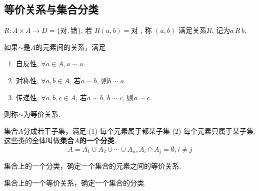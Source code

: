 \subsection{等价关系与集合分类}

\begin{Definition}[关系\mbox{[Relation]}]
$R: A \times A \rightarrow D = \{\text{对}, \text{错}\} $, 
若
$R(a, b) = \text{对}$
, 称
$(a, b)$
满足关系$R$, 记为$a \, R \, b$.
\end{Definition}

\begin{Definition}[等价关系]
如果$\sim$是$A$的元素间的关系，满足 
\begin{enumerate}[(1)]
\item 自反性, $\forall a \in A, a \sim a$.
\item 对称性, $\forall a, b \in A$, 若$a \sim b$, 则$b \sim a$.
\item 传递性, $\forall a, b, c \in A$, 若$a \sim b$, $b\sim c$, 则$a \sim c$.
\end{enumerate}
则称$\sim$为等价关系.
\end{Definition}

\begin{Definition}[集合分类、划分]
集合$A$分成若干子集，满足 (1) 每个元素属于都某子集 (2) 每个元素只属于某子集. 这些类的全体叫做\textbf{集合$A$的一个分类}.
$$ A = A_1 \cup A_2 \cup \cdots \cup A_n, A_i \cap A_j = \emptyset, i \neq j$$
\end{Definition}

\begin{Theorem}
集合上的一个分类，确定一个集合的元素之间的等价关系.
\end{Theorem}

\begin{Theorem}
集合上的一个等价关系，确定一个集合的分类.
\end{Theorem}

\begin{Definition}
{}
\end{Definition}
